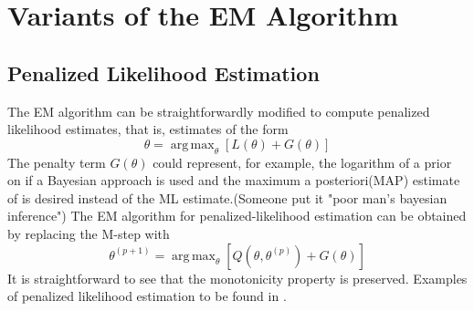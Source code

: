 \documentclass[11pt]{article}
\DeclareMathOperator*{\argmax}{arg\,max}
\begin{document}
\section{Variants of the EM Algorithm}
\subsection{Penalized Likelihood Estimation}
The EM algorithm can be straightforwardly modified to compute penalized likelihood estimates, that is, estimates of the form
\begin{equation}
\theta = \argmax_{\theta}[L(\theta)+G(\theta)]
\end{equation}
The penalty term $G(\theta)$ could represent, for example, the logarithm of a prior on if a Bayesian approach is used and the maximum a posteriori(MAP) estimate of is desired instead of the ML estimate.(Someone put it "poor man’s bayesian inference\cite{LifeAfter}") The EM algorithm for penalized-likelihood estimation can be obtained by replacing the M-step with
\begin{equation}
\theta^{(p+1)}=\argmax_{\theta}[Q(\theta, \theta^{(p)}) +G(\theta)]
\end{equation}
It is straightforward to see that the monotonicity property is preserved. Examples of penalized likelihood estimation to be found in \cite{penalized}.
\end{document}
